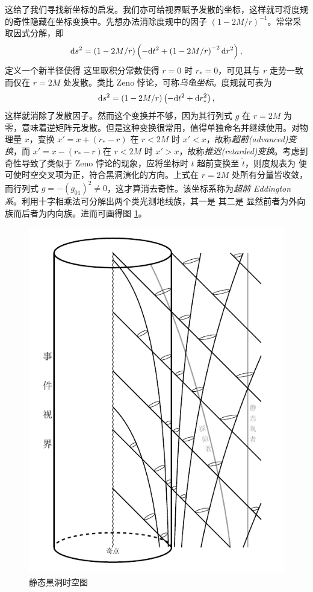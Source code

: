 这给了我们寻找新坐标的启发。我们亦可给视界赋予发散的坐标，这样就可将度规的奇性隐藏在坐标变换中。先想办法消除度规中的因子 $(1-2M/r)^{-1}$。常常采取因式分解，即
\[
\dd s^2=\left(1-{2M}/{r}\right)\left(-\dd t^2+\left(1-{2M}/{r}\right)^{-2}\dd r^2\right),
\]
定义一个新半径使得
这里取积分常数使得 $r=0$ 时 $r_*=0$，可见其与 $r$ 走势一致而仅在 $r=2M$ 处发散。类比 Zeno 悖论，可称\textit{乌龟坐标}。度规就可表为
\[
\dd s^2=(1-2M/r)\left(-\dd t^2+\dd r_*^2\right),
\]
这样就消除了发散因子。然而这个变换并不够，因为其行列式 $g$ 在 $r=2M$ 为零，意味着逆矩阵元发散。但是这种变换很常用，值得单独命名并继续使用。对物理量 $x$，变换 $x'=x+(r_*-r)$ 在 $r<2M$ 时 $x'<x$，故称\textit{超前(advanced)变换}，而 $x'=x-(r_*-r)$在 $r<2M$ 时 $x'>x$，故称\textit{推迟(retarded)变换}。考虑到奇性导致了类似于 Zeno 悖论的现象，应将坐标时 $t$ 超前变换至 $\tilde t$，则度规表为
便可使时空交叉项为正，符合黑洞演化的方向。上式在 $r=2M$ 处所有分量皆收敛，而行列式 $g=-(g_{01})^2\ne 0$，这才算消去奇性。该坐标系称为\textit{超前 Eddington 系}。利用十字相乘法可分解出两个类光测地线族，其一是
其二是
显然前者为外向族而后者为内向族。进而可画得图 \ref{fig:mink}。
\begin{figure}[h!]
    \centering
    \includegraphics[width=.6\textwidth]{fig/chpt02/schBH.pdf}
    \caption{静态黑洞时空图}
    \label{fig:mink}
\end{figure}
